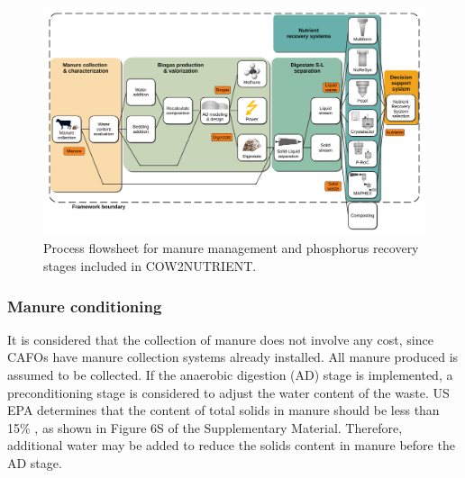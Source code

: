 \begin{refsection}[referencesCh4]
\begin{figure}[h]
	\centering
	\includegraphics[width=\linewidth, trim=1cm 1cm 1cm 1cm, clip]{gfx/Chapter4/Process_Flowsheet2.pdf} 
	\caption{Process flowsheet for manure management and phosphorus recovery stages included in COW2NUTRIENT.}
	\label{fig:flowsheet}
\end{figure}

\subsubsection{Manure conditioning}
It is considered that the collection of manure does not involve any cost, since CAFOs have manure collection systems already installed. All manure produced is assumed to be collected. If the anaerobic digestion (AD) stage is implemented, a preconditioning stage is considered to adjust the water content of the waste. US EPA determines that the content of total solids in manure should be less than 15\% \citep{AgSTARHandbook}, as shown in Figure 6S of the Supplementary Material. Therefore, additional water may be added to reduce the solids content in manure before the AD stage.


\end{refsection}
